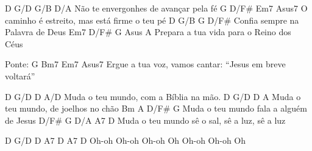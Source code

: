 \beginverse
D           G/D           G/B      D/A	
Não te envergonhes de avançar pela fé
  G           D/F#            Em7         Asus7
O caminho é estreito, mas está firme o teu pé
D      G/B         G        D/F#
Confia sempre na Palavra de Deus
   Em7        D/F#        G         Asus A
Prepara a tua vida para o Reino dos Céus

\endverse

\beginverse
Ponte: 
G                Bm7            Em7            Asus7   
Ergue a tua voz, vamos cantar: “Jesus em breve voltará”

\endverse

\beginchorus
D          G/D          D         A/D
Muda o teu mundo, com a Bíblia na mão.
D          G/D         D        A
Muda o teu mundo, de joelhos no chão
Bm         A             D/F#       G
Muda o teu mundo fala a alguém de Jesus
D/F#       G          D/A       A7        D
Muda o teu mundo sê o sal, sê a luz, sê a luz

D     G/D   D     A7   D     A7    D
Oh-oh Oh-oh Oh-oh Oh   Oh-oh Oh-oh Oh

\endchorus

\endsong
